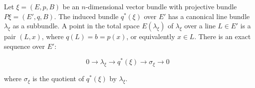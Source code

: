 Let $\xi = (E, p, B)$ be an $n$-dimensional vector bundle with projective bundle $P\xi = (E', q, B)$. The induced bundle $q^*(\xi)$ over $E'$ has a canonical line bundle $\lambda_\xi$ as a subbundle. A point in the total space $E(\lambda_\xi)$ of $\lambda_\xi$ over a line $L \in E'$ is a pair $(L, x)$, where $q(L) = b = p(x)$, or equivalently $x \in L$. There is an exact sequence over $E'$:

$$0 \to \lambda_\xi \to q^*(\xi) \to \sigma_\xi \to 0$$

where $\sigma_\xi$ is the quotient of $q^*(\xi)$ by $\lambda_\xi$.
